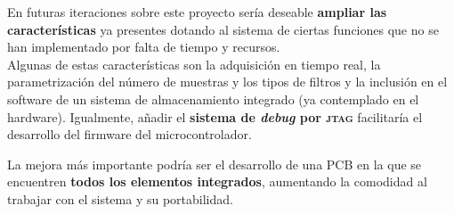 En futuras iteraciones sobre este proyecto sería deseable \textbf{ampliar las características} ya presentes dotando al sistema de ciertas funciones que no se han implementado por falta de tiempo y recursos.\\
Algunas de estas características son la adquisición en tiempo real, la parametrización del número de muestras y los tipos de filtros y la inclusión en el software de un sistema de almacenamiento integrado (ya contemplado en el hardware). Igualmente, añadir el \textbf{sistema de \textit{debug} por \textsc{\acrshort{jtag}}} facilitaría el desarrollo del firmware del microcontrolador.

La mejora más importante podría ser el desarrollo de una \acrshort{PCB} en la que se encuentren \textbf{todos los elementos integrados}, aumentando la comodidad al trabajar con el sistema y su portabilidad.


